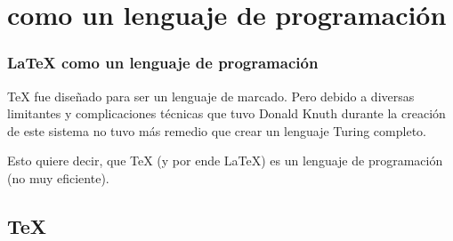 \documentclass[12pt,aspectratio=169,ignorenonframetext]{ltxbeamer}
\begin{document}
\section{\lmr{\LaTeX} como un lenguaje de programación}

\begin{frame}
\frametitle{{\lmr\LaTeX} como un lenguaje de programación}

{\lmr\TeX} fue diseñado para ser un lenguaje de marcado.
Pero debido a diversas limitantes y complicaciones técnicas que tuvo Donald Knuth durante la creación de este sistema no tuvo más remedio que crear un lenguaje Turing completo.

Esto quiere decir, que {\lmr\TeX} (y por ende {\lmr\LaTeX}) es un lenguaje de programación (no muy eficiente).
\end{frame}





\subsection{{\lmr\TeX}}






\end{document}
